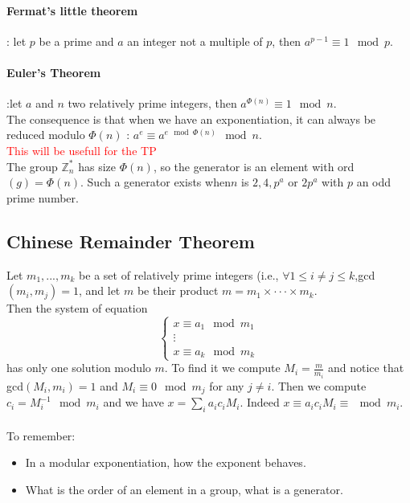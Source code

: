 \documentclass[11pt,a4paper]{report}
\begin{document}
\paragraph{Fermat's little theorem} : let $p$ be a prime and $a$ an integer not a multiple of $p$, then $a^{p-1} \equiv 1 \mod p$.
\paragraph{Euler's Theorem} :let $a$ and $n$ two relatively prime integers, then $a^{\Phi(n)} \equiv 1 \mod n$.\\
The consequence is that when we have an exponentiation, it can always be reduced modulo $\Phi(n)$ : $a^e \equiv a^{e \mod \Phi(n)} \mod n$.\\
\textcolor{red}{This will be usefull for the TP}\\

The group $\mathbb{Z}_n^*$ has size $\Phi(n)$, so the generator is an element with ord$(g) = \Phi(n)$. Such a generator exists when$n$ is $2,4,p^a$ or $2p^a$ with $p$ an odd prime number.

\subsection{Chinese Remainder Theorem}
Let ${m_1, . . . , m_k}$ be a set of relatively prime integers (i.e., $ \forall 1 \leq i \neq j \leq k$,gcd$(m_i,m_j) = 1$, and let $m$ be their product $m = m_1 \times · · · \times m_k$.\\
Then the system of equation
$$\left\lbrace \begin{array}{c}
x \equiv a_1 \mod m_1 \\
\vdots\\
x \equiv a_k \mod m_k
\end{array}\right.$$
has only one solution modulo $m$. To find it we compute $M_i = \frac{m}{m_i}$ and notice that gcd$(M_i,m_i) = 1$ and $M_i \equiv 0 \mod m_j$ for any $j \neq i$. Then we compute $c_i = M_i^{-1} \mod m_i$ and we have $x = \sum\limits_i a_i c_i M_i$. Indeed $x \equiv a_i c_i M_i \equiv\mod m_i$.\\
\\
To remember:
\begin{itemize}
\item In a modular exponentiation, how the exponent behaves.
\item What is the order of an element in a group, what is a generator.
\end{itemize}
\end{document}
